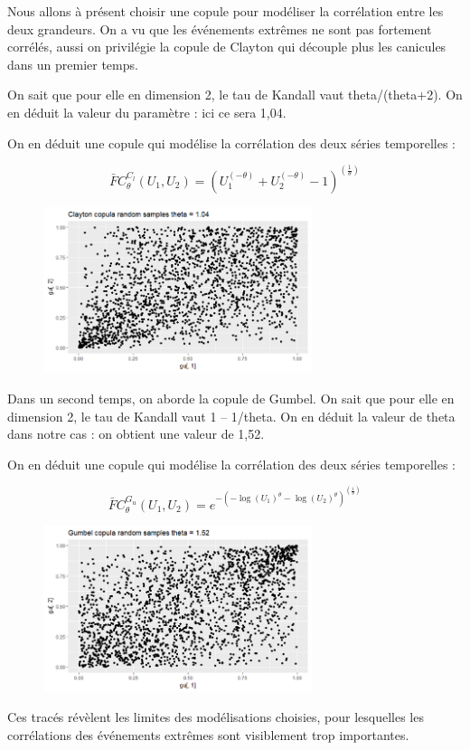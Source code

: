 \documentclass[../report.tex]{subfiles}
\begin{document}
\par Nous allons à présent choisir une copule pour modéliser la corrélation entre les deux grandeurs. On a vu que les événements extrêmes ne sont pas fortement corrélés, aussi on privilégie la copule de Clayton qui découple plus les canicules dans un premier temps.

\par On sait que pour elle en dimension 2, le tau de Kandall vaut theta/(theta+2). On en déduit la valeur du paramètre : ici ce sera 1,04.

\par On en déduit une copule qui modélise la corrélation des deux séries temporelles :

\begin{displaymath}
\bar{F} C_{\theta}^{C_l} (U_1,U_2)= \left(U_1^(-\theta)+U_2^(-\theta)-1 \right)^(\frac{1}{\theta})
\end{displaymath}

\begin{figure}[H]
  \centering
    \includegraphics[width=0.7\textwidth]{images/part_3/scatterclayton.png}
\end{figure}

\par Dans un second temps, on aborde la copule de Gumbel. On sait que pour elle en dimension 2, le tau de Kandall vaut 1 – 1/theta. On en déduit la valeur de theta dans notre cas : on obtient une valeur de 1,52.

\par On en déduit une copule qui modélise la corrélation des deux séries temporelles :

\begin{displaymath}
\bar{F} C_{\theta}^{G_u} (U_1,U_2)= e^{-(-\log(U_1 )^{\theta}-\log(U_2 )^{\theta} )^(\frac{1}{\theta})}
\end{displaymath}

\begin{figure}[H]
  \centering
    \includegraphics[width=0.7\textwidth]{images/part_3/scattergumbel.png}
\end{figure}

\par Ces tracés révèlent les limites des modélisations choisies, pour lesquelles les corrélations des événements extrêmes sont visiblement trop importantes.
\end{document}
